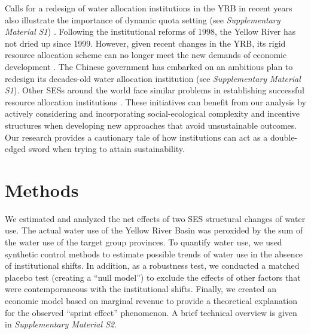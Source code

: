 \documentclass{nsr}
\begin{document}
Calls for a redesign of water allocation institutions in the YRB in recent years also illustrate the importance of dynamic quota setting (see \textit{Supplementary Material S1}) \cite{yuAdaptabilityassessmentpromotion2019}. Following the institutional reforms of 1998, the Yellow River has not dried up since 1999. However, given recent changes in the YRB, its rigid resource allocation scheme can no longer meet the new demands of economic development \cite{wangThingsCurrentSignificance2019}. The Chinese government has embarked on an ambitious plan to redesign its decades-old water allocation institution (see \textit{Supplementary Material S1}). Other SESs around the world face similar problems in establishing successful resource allocation institutions \cite{cummingQuantifyingSocialEcologicalScale2020, muneepeerakulStrategicbehaviorsgovernance2017, cummingAdvancingunderstandingnatural2020, leslieOperationalizingsocialecologicalsystems2015}. These initiatives can benefit from our analysis by actively considering and incorporating social-ecological complexity and incentive structures when developing new approaches that avoid unsustainable outcomes. Our research provides a cautionary tale of how institutions can act as a double-edged sword when trying to attain sustainability.


\section{Methods}
We estimated and analyzed the net effects of two SES structural changes of water use. The actual water use of the Yellow River Basin was peroxided by the sum of the water use of the target group provinces. To quantify water use, we used synthetic control methods to estimate possible trends of water use in the absence of institutional shifts. In addition, as a robustness test, we conducted a matched placebo test (creating a “null model”) to exclude the effects of other factors that were contemporaneous with the institutional shifts. Finally, we created an economic model based on marginal revenue to provide a theoretical explanation for the observed “sprint effect” phenomenon. A brief technical overview is given in \textit{Supplementary Material S2}.
\end{document}
